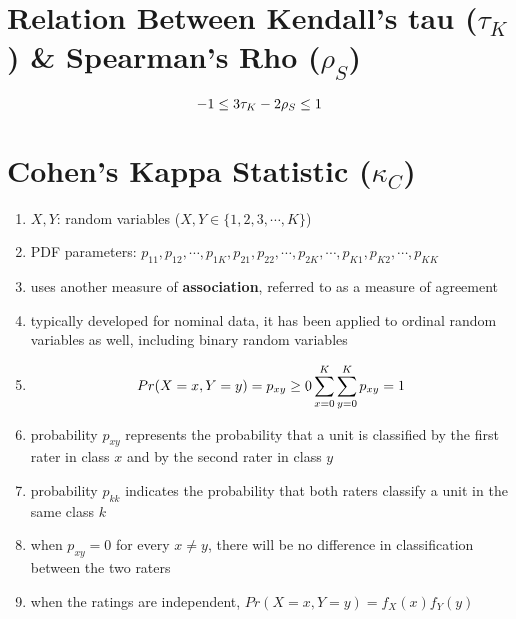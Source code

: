 \section{Relation Between Kendall’s tau ($\tau_K$) \& Spearman’s Rho ($\rho_S$) \cite{ism-1}}\label{Relation Between Kendall’s tau and Spearman’s Rho}

\[
    \hfill
    -1 \leq 3\tau_K - 2\rho_S \leq 1
    \hfill
\]


\section{Cohen’s Kappa Statistic ($\kappa_C$) \cite{ism-1}} \label{Multivariate Distributions: Cohen’s Kappa Statistic}

\begin{enumerate}
    \item[] $X, Y$: random variables ($X, Y \in \{1, 2, 3,\cdots, K\}$) 

    \item[] PDF parameters: $p_{11}, p_{12},\cdots, p_{1K}, p_{21}, p_{22},\cdots, p_{2K},\cdots, p_{K1}, p_{K2},\cdots, p_{KK}$ 
    
    \item uses another measure of \textbf{association}, referred to as a measure of agreement

    \item typically developed for nominal data, it has been applied to ordinal random variables as well, including binary random variables

    \item[] \[
        \hfill
        Pr(X=x,Y=y) = p_{xy} \geq 0
        \hfill
        \dsum_{x=0}^K \dsum_{y=0}^K p_{xy} = 1
        \hfill
    \] 

    \item probability $p_{xy}$ represents the probability that a unit is classified by the first rater in class $x$ and by the second rater in class $y$

    \item probability $p_{kk}$ indicates the probability that both raters classify a unit in the same class $k$

    \item when $p_{xy} = 0$ for every $x \neq y$, there will be no difference in classification between the two raters

    \item when the ratings are independent, $Pr(X = x, Y = y) = f_X(x)f_Y(y)$


\end{enumerate}
